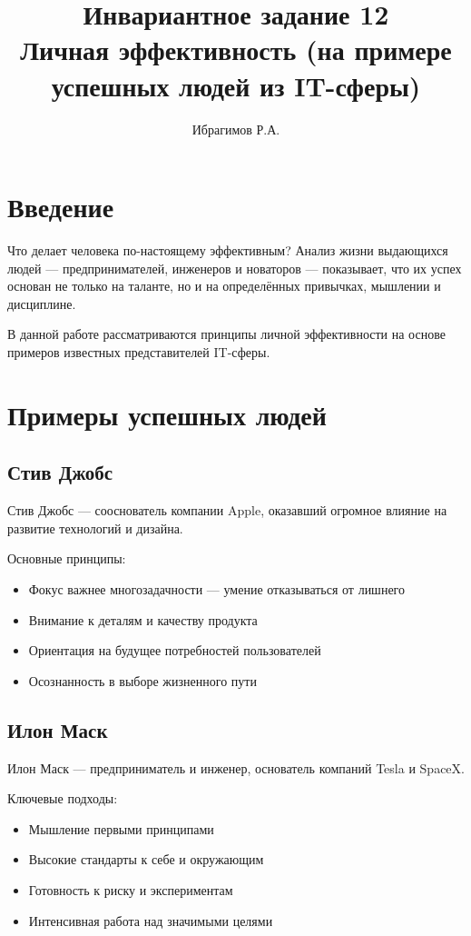 \documentclass[12pt,a4paper]{article}
\title{Инвариантное задание 12\\
Личная эффективность (на примере успешных людей из IT-сферы)}
\author{Ибрагимов Р.А.}
\date{}
\begin{document}
\maketitle

\section{Введение}

Что делает человека по-настоящему эффективным? Анализ жизни выдающихся людей — предпринимателей, инженеров и новаторов — показывает, что их успех основан не только на таланте, но и на определённых привычках, мышлении и дисциплине.

В данной работе рассматриваются принципы личной эффективности на основе примеров известных представителей IT-сферы.

\section{Примеры успешных людей}

\subsection{Стив Джобс}

Стив Джобс — сооснователь компании Apple, оказавший огромное влияние на развитие технологий и дизайна.

Основные принципы:
\begin{itemize}
    \item Фокус важнее многозадачности — умение отказываться от лишнего
    \item Внимание к деталям и качеству продукта
    \item Ориентация на будущее потребностей пользователей
    \item Осознанность в выборе жизненного пути
\end{itemize}

\subsection{Илон Маск}

Илон Маск — предприниматель и инженер, основатель компаний Tesla и SpaceX.

Ключевые подходы:
\begin{itemize}
    \item Мышление первыми принципами
    \item Высокие стандарты к себе и окружающим
    \item Готовность к риску и экспериментам
    \item Интенсивная работа над значимыми целями
\end{itemize}
\end{document}
